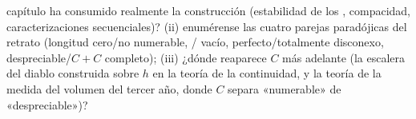 \begin{problem}[{Problema del fin de semana --- el \omterm{pb:b1:topology:1}{conjunto de Cantor}
de los tercios centrales: longitud cero, no numerable, perfecto y
$C + C = \intcc{0}{2}$}]
\begin{enumerate}[resume]
        capítulo ha consumido realmente la construcción (estabilidad
        de los , compacidad, caracterizaciones
        secuenciales)? (ii) enumérense las cuatro parejas paradójicas
        del retrato (longitud cero/no numerable, /
        vacío, perfecto/totalmente disconexo, despreciable/$C+C$
        completo); (iii) ¿dónde reaparece $C$ más adelante (la
        escalera del diablo construida sobre $h$ en la teoría de la
        continuidad, y la teoría de la medida del volumen del tercer
        año, donde $C$ separa «numerable» de «despreciable»)?
\end{enumerate}
\end{problem}
